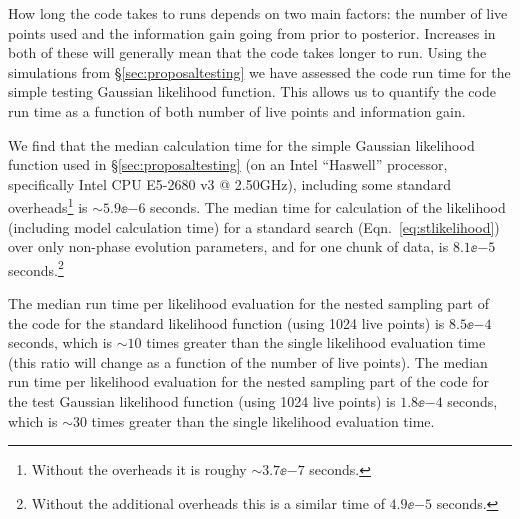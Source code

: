 How long the code takes to runs depends on two main factors: the number of live points used and the information gain going from prior to posterior. Increases
in both of these will generally mean that the code takes longer to run. Using the simulations from \S\ref{sec:proposaltesting} we have assessed the code
run time for the simple testing Gaussian likelihood function. This allows us to quantify the code run time as a function of both number of live points and information
gain.

We find that the median calculation time for the simple Gaussian likelihood function used in \S\ref{sec:proposaltesting} (on an Intel ``Haswell'' processor,
specifically Intel CPU E5-2680 v3 @ 2.50GHz), including some standard overheads\footnote{Without the overheads it is roughy $\sim 3.7\ee{-7}$ seconds.} is 
$\sim 5.9\ee{-6}$ seconds. The median time for calculation of the likelihood (including model calculation time) for a standard search (Eqn.~\ref{eq:stlikelihood})
over only non-phase evolution parameters, and for one chunk of data, is $8.1\ee{-5}$ seconds.\footnote{Without the additional overheads this is a similar time of
$4.9\ee{-5}$ seconds.}

The median run time per likelihood evaluation for the nested sampling part of the code for the standard likelihood function (using 1024 live points) 
is $8.5\ee{-4}$ seconds, which is $\sim 10$ times greater than the single likelihood evaluation time (this ratio will change as a function of the number
of live points). The median run time per likelihood evaluation for the nested sampling part of the code for the test Gaussian likelihood function
(using 1024 live points) is $1.8\ee{-4}$ seconds, which is $\sim 30$ times greater than the single likelihood evaluation time.

